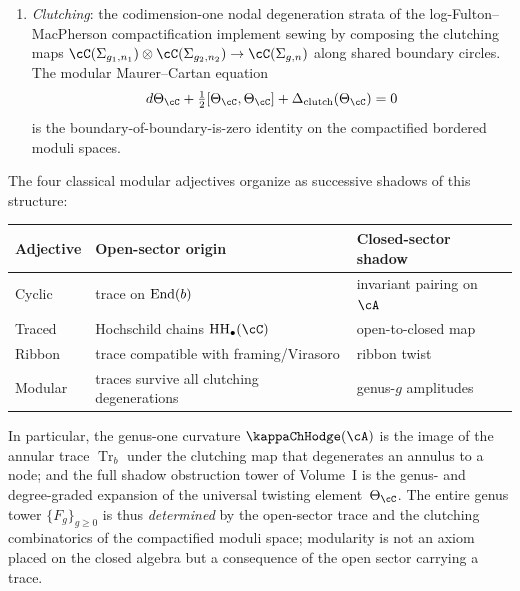 \begin{principle}
\begin{enumerate}[label=\textup{(\roman*)}]
\item \emph{Clutching}: the codimension-one nodal degeneration
 strata of the log-Fulton--MacPherson compactification implement
 sewing by composing the clutching maps
 $\cC(\Sigma_{g_1,n_1}) \otimes \cC(\Sigma_{g_2,n_2})
 \to \cC(\Sigma_{g,n})$
 along shared boundary circles. The modular Maurer--Cartan
 equation
 \begin{equation}\label{eq:modular-mc-trace}
 d\Theta_\cC + \tfrac{1}{2}[\Theta_\cC,\Theta_\cC]
 + \Delta_{\mathrm{clutch}}(\Theta_\cC) = 0
 \end{equation}
 is the boundary-of-boundary-is-zero identity on the
 compactified bordered moduli spaces.
\end{enumerate}
The four classical modular adjectives organize as successive
shadows of this structure:
\begin{center}
\begin{tabular}{lll}
\textbf{Adjective} & \textbf{Open-sector origin}
 & \textbf{Closed-sector shadow} \\
\midrule
Cyclic & trace on $\mathrm{End}(b)$
 & invariant pairing on $\cA$ \\
Traced & Hochschild chains $\HH_\bullet(\cC)$
 & open-to-closed map \\
Ribbon & trace compatible with framing/Virasoro
 & ribbon twist \\
Modular & traces survive all clutching degenerations
 & genus-$g$ amplitudes \\
\end{tabular}
\end{center}
In particular, the genus-one curvature $\kappaChHodge(\cA)$ is the image
of the annular trace $\operatorname{Tr}_b$ under the clutching map
that degenerates an annulus to a node; and the full shadow
obstruction tower of Volume~I is the genus- and degree-graded
expansion of the universal twisting element~$\Theta_\cC$.
The entire genus tower $\{F_g\}_{g \geq 0}$ is thus
\emph{determined} by the open-sector trace and the clutching
combinatorics of the compactified moduli space; modularity is not
an axiom placed on the closed algebra but a consequence of the open
sector carrying a trace.
\end{principle}

